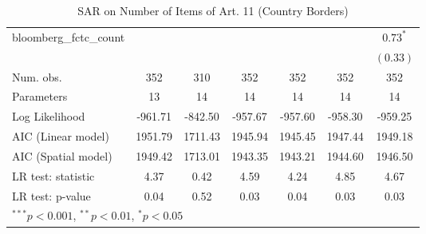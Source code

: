 \begin{table}[!h]
\begin{center}
\begin{tabular}{l c c c c c c }
bloomberg\_fctc\_count  &              &              &              &              &              & $0.73^{*}$   \\
                        &              &              &              &              &              & $(0.33)$     \\
\midrule
Num. obs.               & 352          & 310          & 352          & 352          & 352          & 352          \\
Parameters              & 13           & 14           & 14           & 14           & 14           & 14           \\
Log Likelihood          & -961.71      & -842.50      & -957.67      & -957.60      & -958.30      & -959.25      \\
AIC (Linear model)      & 1951.79      & 1711.43      & 1945.94      & 1945.45      & 1947.44      & 1949.18      \\
AIC (Spatial model)     & 1949.42      & 1713.01      & 1943.35      & 1943.21      & 1944.60      & 1946.50      \\
LR test: statistic      & 4.37         & 0.42         & 4.59         & 4.24         & 4.85         & 4.67         \\
LR test: p-value        & 0.04         & 0.52         & 0.03         & 0.04         & 0.03         & 0.03         \\
\bottomrule
\multicolumn{7}{l}{\scriptsize{$^{***}p<0.001$, $^{**}p<0.01$, $^*p<0.05$}}
\end{tabular}
\caption{SAR on Number of Items of Art. 11 (Country Borders)}
\label{table:coefficients}
\end{center}
\end{table}
